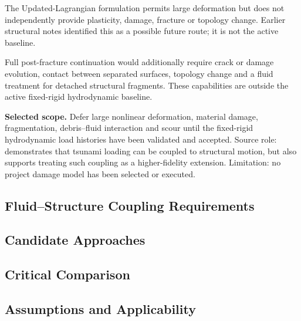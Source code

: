 The Updated-Lagrangian formulation permits large deformation but does not independently provide plasticity, damage, fracture or topology change. Earlier structural notes identified this as a possible future route; it is not the active baseline.

Full post-fracture continuation would additionally require crack or damage evolution, contact between separated surfaces, topology change and a fluid treatment for detached structural fragments. These capabilities are outside the active fixed-rigid hydrodynamic baseline.

\textbf{Selected scope.} Defer large nonlinear deformation, material
damage, fragmentation, debris--fluid interaction and scour until the
fixed-rigid hydrodynamic load histories have been validated and
accepted. Source role: \textcite{baragamage2024fullycoupled}
demonstrates that tsunami loading can be coupled to structural motion,
but also supports treating such coupling as a higher-fidelity
extension. Limitation: no project damage model has been selected or
executed.


\subsection{Fluid--Structure Coupling Requirements}
\label{sec:res-str-dmg-fluid-structure-coupling-requirements}


\subsection{Candidate Approaches}
\label{sec:res-str-dmg-candidate-approaches}


\subsection{Critical Comparison}
\label{sec:res-str-dmg-critical-comparison}


\subsection{Assumptions and Applicability}
\label{sec:res-str-dmg-assumptions}

